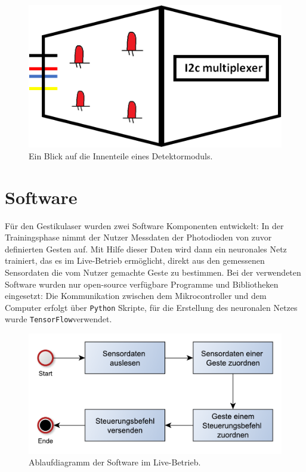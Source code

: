 \documentclass{sciposter}
\begin{document}
\begin{multicols}{3}
\begin{figure}[h]
	\centering
	\includegraphics[scale=1.3]{../figures/DetektormodulOffen.png}
	\caption{Ein Blick auf die Innenteile eines Detektormoduls.}
	\label{fig:Detektormodul}
\end{figure}

\section{Software}
Für den Gestikulaser wurden zwei Software Komponenten entwickelt: In der Trainingsphase nimmt der Nutzer Messdaten der Photodioden von zuvor definierten Gesten auf. Mit Hilfe dieser Daten wird dann ein neuronales Netz trainiert, das es im Live-Betrieb ermöglicht, direkt aus den gemessenen Sensordaten die vom Nutzer gemachte Geste zu bestimmen. Bei der verwendeten Software wurden nur open-source verfügbare Programme und Bibliotheken eingesetzt: Die Kommunikation zwischen dem Mikrocontroller und dem Computer erfolgt über \texttt{Python} Skripte, für die Erstellung des neuronalen Netzes wurde \texttt{TensorFlow}\texttrademark verwendet.

\begin{figure}[h]
	\centering
	\includegraphics[scale=0.75]{../figures/AblaufSteuerung.pdf}
	\caption{Ablaufdiagramm der Software im Live-Betrieb.}
	\label{fig:AblaufSteuerung}
\end{figure}


\end{multicols}
\end{document}
